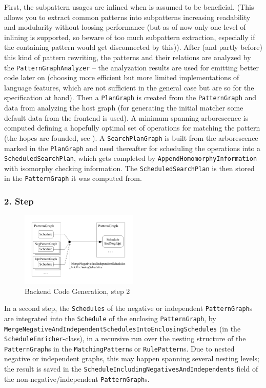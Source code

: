 First, the subpattern usages are inlined when  is assumed to be beneficial.
(This allows you to extract common patterns into subpatterns increasing readability and modularity without loosing performance (but as of now only one level of inlining is supported, so beware of too much subpattern extraction, especially if the containing pattern would get disconnected by this)). 
After (and partly before) this kind of pattern rewriting, the patterns and their relations are analyzed by the \texttt{PatternGraphAnalyzer} -- the analyzation results are used for emitting better code later on (choosing more efficient but more limited implementations of language features, which are not sufficient in the general case but are so for the specification at hand).
Then a \texttt{PlanGraph} is created from the \texttt{PatternGraph} and data from analyzing the host graph (for generating the initial matcher some default data from the frontend is used).
A minimum spanning arborescence is computed defining a hopefully optimal set of operations for matching the pattern (the hopes are founded, see \cite{BKG:07}).
A \texttt{SearchPlanGraph} is built from the arborescence marked in the \texttt{PlanGraph} and used thereafter for scheduling the operations into a \texttt{ScheduledSearchPlan}, which gets completed by \texttt{Append\-Homomorphy\-Information} with isomorphy checking information.
The \texttt{ScheduledSearchPlan} is then stored in the \texttt{PatternGraph} it was computed from.


\subsubsection*{2. Step}

\begin{figure}[htbp]
  \centering
  \includegraphics[width=0.5\textwidth]{fig/AblaufCodeerzeugungBackend2}
  \caption{Backend Code Generation, step 2}
  \label{figbackendcodegen2}
\end{figure}

In a second step, the \texttt{Schedules} of the negative or independent \texttt{Pattern\-Graph}s are integrated into the \texttt{Schedule} of the enclosing \texttt{Pattern\-Graph}, by \texttt{Merge\-Negative\-And\-Independent\-Schedules\-Into\-Enclosing\-Schedules} (in the \texttt{Schedule\-Enricher}-class), in a recursive run over the nesting structure of the \texttt{Pattern\-Graph}s in the \texttt{Matching\-Pattern}s or \texttt{Rule\-Pattern}s.
Due to nested negative or independent graphs, this may happen spanning several nesting levels;
the result is saved in the \texttt{Schedule\-Including\-Negatives\-And\-Independents} field of the non-negative/independent \texttt{Pattern\-Graph}s.


